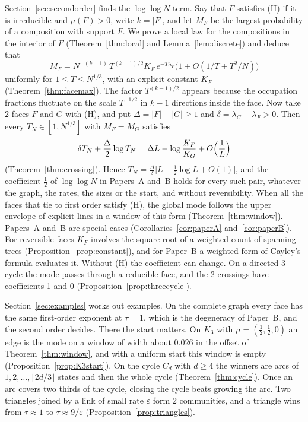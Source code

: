 Section~\ref{sec:secondorder} finds the $\log\log N$ term. Say that $F$
satisfies (H) if it is irreducible and $\mu(F)>0$, write $k=\lvert F\rvert$,
and let $M_F$ be the largest probability of a composition with support $F$.
We prove a local law for the compositions in the interior of $F$
(Theorem~\ref{thm:local} and Lemma~\ref{lem:discrete}) and deduce that
\[
 M_F=N^{-(k-1)}\,T^{(k-1)/2}K_F\,e^{-T\lambda_F}\bigl(1+O(1/T+T^2/N)\bigr)
\]
uniformly for $1\le T\le N^{1/3}$, with an explicit constant $K_F$
(Theorem~\ref{thm:facemax}). The factor $T^{(k-1)/2}$ appears because the
occupation fractions fluctuate on the scale $T^{-1/2}$ in $k-1$ directions
inside the face. Now take 2 faces $F$ and $G$ with (H), and put
$\Delta=\lvert F\rvert-\lvert G\rvert\ge1$ and $\delta=\lambda_G-\lambda_F>0$.
Then every $T_N\in[1,N^{1/3}]$ with $M_F=M_G$ satisfies
\[
 \delta T_N+\frac\Delta2\log T_N=\Delta L-\log\frac{K_F}{K_G}
 +O\Bigl(\frac1L\Bigr)
\]
(Theorem~\ref{thm:crossing}). Hence
$T_N=\frac\Delta\delta\bigl[L-\frac12\log L+O(1)\bigr]$, and the
coefficient $\frac12$ of $\log\log N$ in Papers~A and~B holds for every such
pair, whatever the graph, the rates, the sizes or the start, and without
reversibility. When all the faces that tie to first order satisfy (H), the
global mode follows the upper envelope of explicit lines in a window of
this form (Theorem~\ref{thm:window}). Papers~A and~B are special cases
(Corollaries~\ref{cor:paperA} and~\ref{cor:paperB}). For reversible faces
$K_F$ involves the square root of a weighted count of spanning trees
(Proposition~\ref{prop:constant}), and for Paper~B a weighted form of
Cayley's formula evaluates it. Without (H) the coefficient can change. On a
directed 3-cycle the mode passes through a reducible face, and the 2
crossings have coefficients 1 and 0 (Proposition~\ref{prop:threecycle}).

Section~\ref{sec:examples} works out examples. On the complete graph every
face has the same first-order exponent at $\tau=1$, which is the
degeneracy of Paper~B, and the second order decides. There the start
matters. On $K_3$ with $\mu=(\frac12,\frac12,0)$ an edge is the mode on a
window of width about $0.026$ in the offset of Theorem~\ref{thm:window},
and with a uniform start this window is empty
(Proposition~\ref{prop:K3start}). On the cycle $C_d$ with $d\ge4$ the
winners are arcs of $1,2,\dots,\lfloor2d/3\rfloor$ states and then the
whole cycle (Theorem~\ref{thm:cycle}). Once an arc covers two thirds of the
cycle, closing the cycle beats growing the arc. Two triangles joined by a
link of small rate $\varepsilon$ form 2 communities, and a triangle wins
from $\tau\approx1$ to $\tau\approx9/\varepsilon$
(Proposition~\ref{prop:triangles}).

